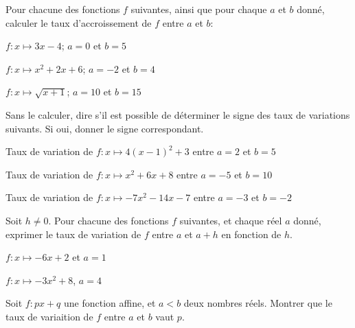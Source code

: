 \documentclass{exos}
\begin{document}
\begin{exercize}
Pour chacune des fonctions $f$ suivantes, ainsi que pour chaque $a$ et $b$ donné, calculer le taux d'accroissement de $f$ entre $a$ et $b$:
\begin{alphaquestions}
\item $f : x \mapsto 3x - 4$; $a = 0$ et $b = 5$
\item $f : x \mapsto x^2 + 2x + 6$; $a = -2$ et $b = 4$
\item $f : x \mapsto \sqrt{x + 1}$; $a = 10$ et $b = 15$
\end{alphaquestions}
\end{exercize}
\vspace*{1cm}
\begin{exercize}
Sans le calculer, dire s'il est possible de déterminer le signe des taux de variations suivants. Si oui, donner le signe correspondant.
\begin{alphaquestions}
\item Taux de variation de $f \colon x \mapsto 4(x-1)^2 + 3$ entre $a = 2$ et $b = 5$
\item Taux de variation de $f \colon x \mapsto x^2 + 6x + 8$ entre $a = -5$ et $b = 10$
\item Taux de variation de $f \colon x \mapsto -7x^2 -14x - 7$ entre $a = -3$ et $b = -2$
\end{alphaquestions}
\end{exercize}
\vspace*{1cm}
\begin{exercize}
Soit $h \neq 0$. Pour chacune des fonctions $f$ suivantes, et chaque réel $a$ donné, exprimer le taux de variation de $f$ entre $a$ et $a + h$ en fonction de $h$.
\begin{alphaquestions}
\item $f : x \mapsto -6x + 2$ et $a = 1$
\item $f : x \mapsto -3x^2 + 8$, $a = 4$
\end{alphaquestions}
\end{exercize}
\vspace*{1cm}
\begin{exercize}
Soit $f : px + q$ une fonction affine, et $a < b$ deux nombres réels. Montrer que le taux de variaition de $f$ entre $a$ et $ b$ vaut $p$.
\end{exercize}
\end{document}
